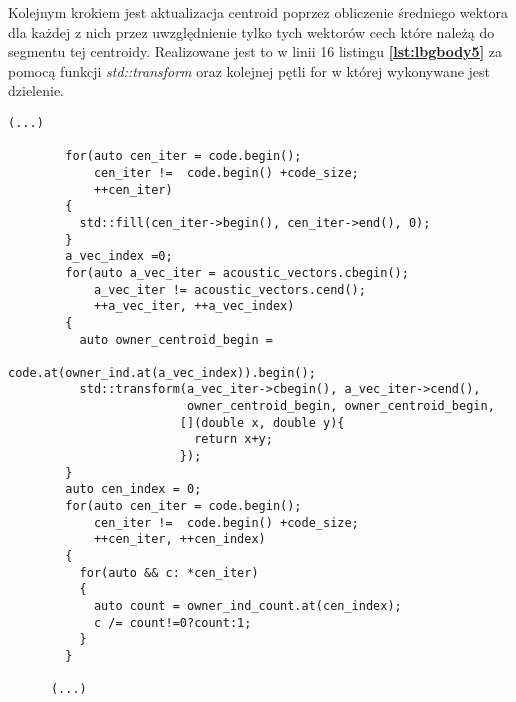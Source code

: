 Kolejnym krokiem jest aktualizacja centroid poprzez obliczenie średniego wektora dla każdej z nich przez uwzględnienie tylko tych wektorów cech które należą do segmentu tej centroidy. Realizowane jest to w linii 16 listingu \textbf{\ref{lst:lbgbody5}} za pomocą funkcji \textit{std::transform} oraz kolejnej pętli for w której wykonywane jest dzielenie.
\begin{lstlisting}[style=lst:cpp, caption=Funkcja \textit{lbg}\label{lst:lbgbody5} - obliczenie ogólnego dopasowania]
      (...)

        for(auto cen_iter = code.begin();
            cen_iter !=  code.begin() +code_size;
            ++cen_iter)
        {
          std::fill(cen_iter->begin(), cen_iter->end(), 0);
        }
        a_vec_index =0;
        for(auto a_vec_iter = acoustic_vectors.cbegin();
            a_vec_iter != acoustic_vectors.cend();
            ++a_vec_iter, ++a_vec_index)
        {
          auto owner_centroid_begin =
                              code.at(owner_ind.at(a_vec_index)).begin();
          std::transform(a_vec_iter->cbegin(), a_vec_iter->cend(),
                         owner_centroid_begin, owner_centroid_begin,
                        [](double x, double y){
                          return x+y; 
                        });
        }
        auto cen_index = 0;
        for(auto cen_iter = code.begin();
            cen_iter !=  code.begin() +code_size;
            ++cen_iter, ++cen_index)
        {
          for(auto && c: *cen_iter)
          {
            auto count = owner_ind_count.at(cen_index);
            c /= count!=0?count:1;
          }
        }

      (...)
\end{lstlisting}
